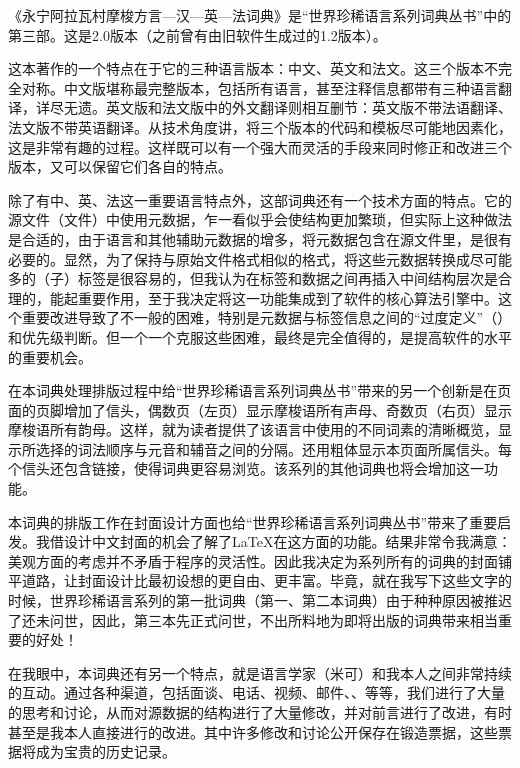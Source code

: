 《永宁阿拉瓦村摩梭方言—汉—英—法词典》是“世界珍稀语言系列词典丛书”中的第三部。这是2.0版本（之前曾有由旧软件生成过的1.2版本）。

这本著作的一个特点在于它的三种语言版本：中文、英文和法文。这三个版本不完全对称。中文版堪称最完整版本，包括所有语言，甚至注释信息都带有三种语言翻译，详尽无遗。英文版和法文版中的外文翻译则相互删节：英文版不带法语翻译、法文版不带英语翻译。从技术角度讲，将三个版本的代码和模板尽可能地因素化，这是非常有趣的过程。这样既可以有一个强大而灵活的手段来同时修正和改进三个版本，又可以保留它们各自的特点。

除了有中、英、法这一重要语言特点外，这部词典还有一个技术方面的特点。它的源文件（文件）中使用元数据，乍一看似乎会使结构更加繁琐，但实际上这种做法是合适的，由于语言和其他辅助元数据的增多，将元数据包含在源文件里，是很有必要的。显然，为了保持与原始文件格式相似的格式，将这些元数据转换成尽可能多的（子）标签是很容易的，但我认为在标签和数据之间再插入中间结构层次是合理的，能起重要作用，至于我决定将这一功能集成到了软件的核心算法引擎中。这个重要改进导致了不一般的困难，特别是元数据与标签信息之间的“过度定义”（）和优先级判断。但一个一个克服这些困难，最终是完全值得的，是提高软件的水平的重要机会。

在本词典处理排版过程中给“世界珍稀语言系列词典丛书”带来的另一个创新是在页面的页脚增加了信头，偶数页（左页）显示摩梭语所有声母、奇数页（右页）显示摩梭语所有韵母。这样，就为读者提供了该语言中使用的不同词素的清晰概览，显示所选择的词法顺序与元音和辅音之间的分隔。还用粗体显示本页面所属信头。每个信头还包含链接，使得词典更容易浏览。该系列的其他词典也将会增加这一功能。

本词典的排版工作在封面设计方面也给“世界珍稀语言系列词典丛书”带来了重要启发。我借设计中文封面的机会了解了\LaTeX{}在这方面的功能。结果非常令我满意：美观方面的考虑并不矛盾于程序的灵活性。因此我决定为系列所有的词典的封面铺平道路，让封面设计比最初设想的更自由、更丰富。毕竟，就在我写下这些文字的时候，世界珍稀语言系列的第一批词典（第一、第二本词典）由于种种原因被推迟了还未问世，因此，第三本先正式问世，不出所料地为即将出版的词典带来相当重要的好处！

在我眼中，本词典还有另一个特点，就是语言学家（米可）和我本人之间非常持续的互动。通过各种渠道，包括面谈、电话、视频、邮件、、等等，我们进行了大量的思考和讨论，从而对源数据的结构进行了大量修改，并对前言进行了改进，有时甚至是我本人直接进行的改进。其中许多修改和讨论公开保存在锻造票据，这些票据将成为宝贵的历史记录。

